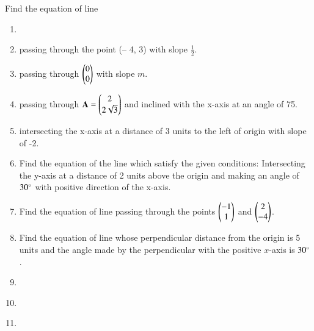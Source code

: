 Find the equation of line 
\begin{enumerate}[label=\thesection.\arabic*,ref=\thesection.\theenumi]

\item 
\label{chapters/11/10/2/1}
%
\item passing through the point (– 4, 3) with slope $\frac{1}{2}$.
\label{chapters/11/10/2/2}

	\item passing through $\begin{pmatrix}0\\0\end{pmatrix}$ with slope $m$.\\
\label{chapters/11/10/2/3}
\solution

    \item passing through 
    $\mathbf{A} = \begin{pmatrix}2\\2\sqrt{3}\end{pmatrix}$ and inclined with the x-axis at an angle 
    of 75\textdegree.
\label{chapters/11/10/2/4}
\\
    \solution 

\item intersecting the x-axis at a distance of 3 units to the left of origin with slope of -2.
\label{chapters/11/10/2/5}
\\
\solution 

\item Find the equation of the line which satisfy the given conditions: Intersecting the y-axis at a distance of 2 units above the origin and making an
angle of $30\degree$ with positive direction of the x-axis.
\\
\solution 

\item Find the equation of line passing through the points $\begin{pmatrix}-1\\1\end{pmatrix}$ and $\begin{pmatrix}2\\-4\end{pmatrix}$.
\\
\solution 

\item Find the equation of line whose perpendicular distance from the origin is 5 units and the angle made by the perpendicular with the positive $x$-axis is $30\degree$.
\label{chapters/11/10/2/8}
\\
\solution

\item 
\label{chapters/11/10/2/9}

\item 
\label{chapters/11/10/2/10}

\item 

\end{enumerate}
